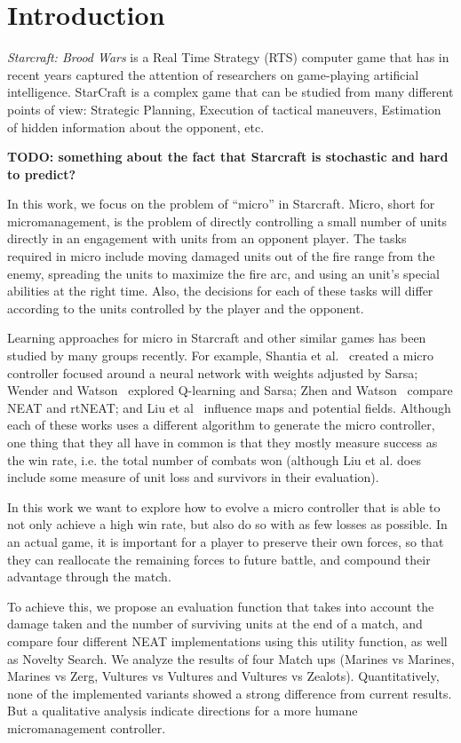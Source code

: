 \section{Introduction}\label{section:introduction}

\emph{Starcraft: Brood Wars} is a Real Time Strategy (RTS) computer
game that has in recent years captured the attention of researchers on
game-playing artificial intelligence. StarCraft is a complex game that
can be studied from many different points of view: Strategic Planning,
Execution of tactical maneuvers, Estimation of hidden information
about the opponent, etc.

{\bf TODO: something about the fact that Starcraft is stochastic and hard to predict?}

In this work, we focus on the problem of ``micro'' in
Starcraft. Micro, short for micromanagement, is the problem of
directly controlling a small number of units directly in an engagement
with units from an opponent player. The tasks required in micro
include moving damaged units out of the fire range from the enemy,
spreading the units to maximize the fire arc, and using an unit's
special abilities at the right time. Also, the decisions for each of
these tasks will differ according to the units controlled by the
player and the opponent.

Learning approaches for micro in Starcraft and other similar games has
been studied by many groups recently. For example, Shantia et
al.~\cite{Shantia11ConnectionistSC} created a micro controller focused around a neural
network with weights adjusted by Sarsa; Wender and
Watson~\cite{Wender12ReinforcementMicroSC} explored Q-learning and Sarsa; Zhen and
Watson~\cite{Zhen13NeuroEvoSC} compare NEAT and rtNEAT; and Liu et
al~\cite{Liu14EffectiveMicro} influence maps and potential fields.  Although each
of these works uses a different algorithm to generate the micro
controller, one thing that they all have in common is that they mostly
measure success as the win rate, i.e. the total number of combats won
(although Liu et al. does include some measure of unit loss and
survivors in their evaluation).

In this work we want to explore how to evolve a micro controller that
is able to not only achieve a high win rate, but also do so with as
few losses as possible. In an actual game, it is important for a player
to preserve their own forces, so that they can reallocate the remaining
forces to future battle, and compound their advantage through the match.

To achieve this, we propose an evaluation function that takes into
account the damage taken and the number of surviving units at the end
of a match, and compare four different NEAT implementations using this
utility function, as well as Novelty Search. We analyze the results of
four Match ups (Marines vs Marines, Marines vs Zerg, Vultures vs
Vultures and Vultures vs Zealots). Quantitatively, none of the
implemented variants showed a strong difference from current
results. But a qualitative analysis indicate directions for a more
humane micromanagement controller.
